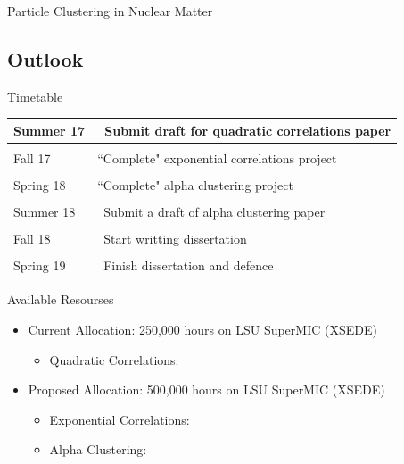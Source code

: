 \documentclass{beamer}
\newcommand{\red}[1]{{\color{red}{#1}}}
\begin{document}
\begin{frame}{Particle Clustering in Nuclear Matter}
   \red{Here put something about the g(r) pair distrubitions}
\end{frame}

\subsection{Outlook}
\begin{frame}{Timetable}
\begin{tabular}{p{2cm}|p{8cm}}
\\[-1.5ex]Summer 17 & ~Submit draft for quadratic correlations paper \\[1.5ex]
\hline \\[-1.5ex]
Fall 17 & ``Complete" exponential correlations project \\[1.5ex]
\hline \\[-1.5ex]
Spring 18 & ``Complete" alpha clustering project \\[1.5ex]
\hline \\[-1.5ex]
Summer 18 & ~Submit a draft of alpha clustering paper \\[1.5ex]
\hline \\[-1.5ex]
Fall 18 & ~Start writting dissertation \\[1.5ex]
\hline \\[-1.5ex]
Spring 19 & ~Finish dissertation and defence \\[1.5ex]
\end{tabular}
\end{frame}

\begin{frame}{Available Resourses}
\begin{itemize}
   \item Current Allocation: 250,000 hours on LSU SuperMIC (XSEDE)
   \begin{itemize}
      \item Quadratic Correlations: 
   \end{itemize}
   \item Proposed Allocation: 500,000 hours on LSU SuperMIC (XSEDE)
   \begin{itemize}
      \item Exponential Correlations: 
      \item Alpha Clustering: 
   \end{itemize}
\end{itemize}
\end{frame}
\end{document}
